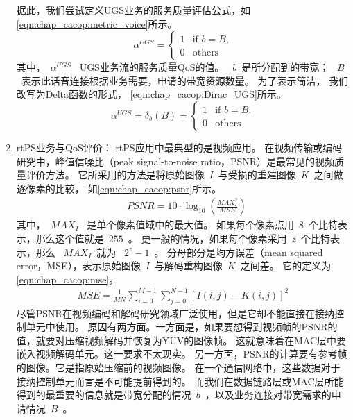 \begin{enumerate}[(1)]
据此，我们尝试定义UGS业务的服务质量评估公式，如\eqref{eqn:chap_cacop:metric_voice}所示。
\begin{equation}
\label{eqn:chap_cacop:metric_voice}
\alpha^{UGS}=
\begin{cases}
1 & \text{if $b=B$,}\\
0 &\text{others}
\end{cases}
\end{equation}
其中，~$\alpha^{UGS}$~ UGS业务流的服务质量QoS的值。
~$b$~是所分配到的带宽；
~$B$~表示此话音连接根据业务需要，申请的带宽资源数量。
为了表示简洁，
我们改写为Delta函数的形式，
\eqref{eqn:chap_cacop:Dirac_UGS}所示。
%
\begin{equation}
\label{eqn:chap_cacop:Dirac_UGS}
\alpha^{UGS}= \delta_{b}(B) = 
\begin{cases}
1 & \text{if $b= B$,}\\
0 &\text{others}
\end{cases}
\end{equation}

\item rtPS业务与QoS评价： 
rtPS应用中最典型的是视频应用。
在视频传输或编码研究中，峰值信噪比（peak signal-to-noise ratio，PSNR）是最常见的视频质量评价方法。
它所采用的方法是将原始图像~$I$~与受损的重建图像~$K$~之间做逐像素的比较，
如\eqref{eqn:chap_cacop:psnr}所示。 
%
\begin{align}
\label{eqn:chap_cacop:psnr}
& PSNR = 10 \cdot \log_{10} \left( \frac{MAX_I^2}{MSE} \right)
\end{align}
其中，~$MAX_I$~ 是单个像素值域中的最大值。
如果每个像素点用~$8$~个比特表示，那么这个值就是~$255$~。
更一般的情况，如果每个像素采用~$z$~个比特表示，那么 ~$MAX_I$~就为 ~$2^z - 1$~。
分母部分是均方误差（mean squared error，MSE），表示原始图像~$I$~与解码重构图像~$K$~之间差。
它的定义为\eqref{eqn:chap_cacop:mse}。
\begin{align}
\label{eqn:chap_cacop:mse}
MSE = \frac{1}{MN} \sum_{i=0}^{M-1}\sum_{j=0}^{N-1} \left[I(i,j) - K(i,j)\right]^2 
\end{align}
尽管PSNR在视频编码和解码研究领域广泛使用，但是它却不能直接在接纳控制单元中使用。
原因有两方面。一方面是，如果要想得到视频帧的PSNR的值，就要对压缩视频解码并恢复为YUV的图像帧。
这就意味着在MAC层中要嵌入视频解码单元。这一要求不太现实。
另一方面，PSNR的计算要有参考帧的图像。它是指原始压缩前的视频图像。
在一个通信网络中，这些数据对于接纳控制单元而言是不可能提前得到的。
而我们在数据链路层或MAC层所能得到的最重要的信息就是带宽分配的情况~$b$~，以及业务连接对带宽需求的申请情况~$B$~。


\end{enumerate}
